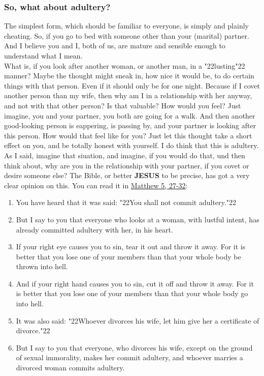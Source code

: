 \documentclass[10pt,a5paper]{article}
\newcommand{\Jesus}[0]{\textbf{JESUS}}
\newcommand{\q}[1]{\char"22{#1}\char"22 }
\begin{document}
	\subsubsection{So, what about adultery?}
		The simplest form,
		which should be familiar to everyone,
		is simply and plainly cheating.
		So,
		if you go to bed with someone other than your (marital) partner.
		And I believe you and I,
		both of us,
		are mature and sensible enough to understand what I mean.
		\\
		What is,
		if you look after another woman,
		or another man,
		in a \q{lusting} manner?
		Maybe the thought might sneak in,
		how nice it would be,
		to do certain things with that person.
		Even if it should only be for one night.
		Because if I covet another person than my wife,
		then why am I in a relationship with her anyway,
		and not with that other person?
		Is that valuable?
		How would you feel?
		Just imagine,
		you and your partner,
		you both are going for a walk.
		And then another good-looking person is eappering,
		is passing by,
		and your partner is looking after this person.
		How would that feel like for you?
		Just let this thought take a short effect on you,
		and be totally honest with yourself.
		I do think that this is adultery.
		As I said,
		imagine that siuation,
		and imagine,
		if you would do that,
		und then think about,
		why are you in the relationship with your partner,
		if you covet or desire someone else?
		The Bible,
		or better {\Jesus} to be precise,
		has got a very clear opinion on this.
		You can read it in \href{https://www.die-bibel.de/bibeln/online-bibeln/lesen/ESV/MAT.5/Matthew-5}{Matthew 5, 27-32}:
		\begin{enumerate}[noitemsep,start=27]
			\item	You have heard that it was said:
					\q{You shall not commit adultery.}
			\item	But I say to you that everyone who looks at a woman,
					with lustful intent,
					has already committed adultery with her,
					in his heart.
			\item	If your right eye causes you to sin,
					tear it out and throw it away.
					For it is better that you lose one of your members than that your whole body be thrown into hell.
			\item	And if your right hand causes you to sin,
					cut it off and throw it away.
					For it is better that you lose one of your members than that your whole body go into hell.
			\item	It was also said:
					\q{Whoever divorces his wife,
					let him give her a certificate of divorce.}
			\item	But I say to you that everyone,
					who divorces his wife,
					except on the ground of sexual immorality,
					makes her commit adultery,
					and whoever marries a divorced woman commits adultery.
		\end{enumerate}
		
\end{document}
